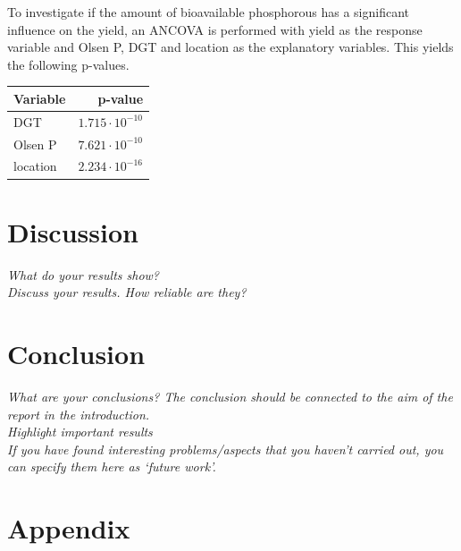 \documentclass[11pt, fleqn, titlepage]{article}
\begin{document}
\noindent To investigate if the amount of bioavailable phosphorous has a significant influence on the yield, an ANCOVA is performed with yield as the response variable and Olsen P, DGT and location as the explanatory variables. This yields the following p-values.

\begin{table}[H]
	\centering
	\begin{tabular}{l r}
		\toprule
		Variable     & p-value                       \\ \midrule
		DGT          & $1.715 \cdot 10^{-10}$       \\ 
		Olsen P      & $7.621 \cdot 10^{-10}$         \\ 
		location     & $2.234 \cdot 10^{-16}$       \\ \bottomrule 
	\end{tabular}
\end{table}

\section{Discussion}
\textit{What do your results show? \\ Discuss your results. How reliable are they?}

\section{Conclusion}
\textit{What are your conclusions? The conclusion should be connected to the aim of the report in the introduction. \\ Highlight important results \\ If you have found interesting problems/aspects that you haven’t carried out, you can specify them here as ‘future work’.}

\section{Appendix}
\end{document}
